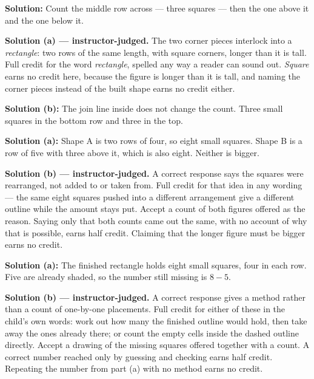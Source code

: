 \documentclass[12pt]{article}
\begin{document}

\textbf{Solution:} Count the middle row across --- three squares --- then the one above it and the one below it. 


\textbf{Solution (a) --- instructor-judged.} The two corner pieces interlock into a \emph{rectangle}: two rows of the same length, with square corners, longer than it is tall. Full credit for the word \emph{rectangle}, spelled any way a reader can sound out. \emph{Square} earns no credit here, because the figure is longer than it is tall, and naming the corner pieces instead of the built shape earns no credit either.

\textbf{Solution (b):} The join line inside does not change the count. Three small squares in the bottom row and three in the top. 


\textbf{Solution (a):} Shape A is two rows of four, so eight small squares. Shape B is a row of five with three above it, which is also eight. Neither is bigger. 

\textbf{Solution (b) --- instructor-judged.} A correct response says the squares were rearranged, not added to or taken from. Full credit for that idea in any wording --- the same eight squares pushed into a different arrangement give a different outline while the amount stays put. Accept a count of both figures offered as the reason. Saying only that both counts came out the same, with no account of why that is possible, earns half credit. Claiming that the longer figure must be bigger earns no credit.


\textbf{Solution (a):} The finished rectangle holds eight small squares, four in each row. Five are already shaded, so the number still missing is $8 - 5$. 

\textbf{Solution (b) --- instructor-judged.} A correct response gives a method rather than a count of one-by-one placements. Full credit for either of these in the child's own words: work out how many the finished outline would hold, then take away the ones already there; or count the empty cells inside the dashed outline directly. Accept a drawing of the missing squares offered together with a count. A correct number reached only by guessing and checking earns half credit. Repeating the number from part (a) with no method earns no credit.
\end{document}
